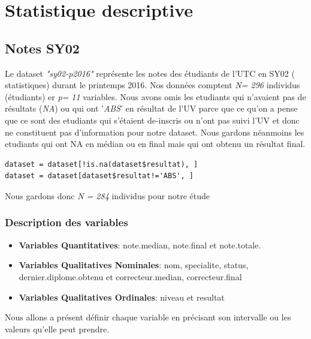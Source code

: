 \documentclass[]{report}
\begin{document}
\section{ Statistique descriptive}

\subsection{Notes SY02}
Le dataset \textit{"sy02-p2016"} représente les notes des étudiants de l'UTC en SY02 ( statistiques) durant le printemps 2016. Nos données comptent \textit{N= 296} individus (étudiants) er \textit{p= 11} variables. Nous avons omis  les etudiants qui n'avaient pas de résultats (\textit{NA}) ou qui ont '\textit{ABS}' en résultat de l'UV parce que ce qu'on a pense que ce sont des etudiants qui s'étaient de-inscris ou n'ont pas suivi l'UV et donc ne constituent pas d'information pour notre dataset. Nous gardons néanmoins les etudiants qui ont NA en médian ou en final mais qui ont obtenu un résultat final. 

\begin{lstlisting}
dataset = dataset[!is.na(dataset$resultat), ]
dataset = dataset[dataset$resultat!='ABS', ]
\end{lstlisting}

Nous gardons donc \textit{N = 284} individus pour notre étude

 \subsubsection{Description des variables}


\begin{itemize}
	  	\item \textbf{Variables Quantitatives}: note.median, note.final et  note.totale.
		\item  \textbf{Variables Qualitatives Nominales}: nom, specialite, status, dernier.diplome.obtenu et correcteur.median, correcteur.final
		\item  \textbf{Variables Qualitatives Ordinales}: niveau et resultat  \\
\end{itemize}
 Nous allons a présent définir  chaque variable en précisant son intervalle ou les valeurs qu'elle peut prendre.
\end{document}
